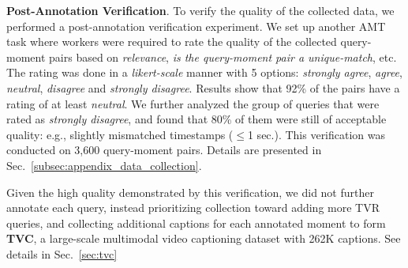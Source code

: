 \documentclass[runningheads]{llncs}
\begin{document}
\noindent\textbf{Post-Annotation Verification}. 
To verify the quality of the collected data, we performed a post-annotation verification experiment. 
We set up another AMT task where workers were required to rate the quality of the collected query-moment pairs based on \textit{relevance}, \textit{is the query-moment pair a unique-match}, etc. 
The rating was done in a \textit{likert-scale} manner with 5 options: \textit{strongly agree}, \textit{agree}, \textit{neutral}, \textit{disagree} and \textit{strongly disagree}. 
Results show that 92\% of the pairs have a rating of at least \textit{neutral}.
We further analyzed the group of queries that were rated as \textit{strongly disagree}, and found that 80\% of them were still of acceptable quality: e.g., slightly mismatched timestamps ($\leq$1 sec.). 
This verification was conducted on 3,600 query-moment pairs. 
Details are presented in Sec.~\ref{subsec:appendix_data_collection}. 

Given the high quality demonstrated by this verification, we did not further annotate each query, instead prioritizing collection toward  adding more TVR queries, and collecting additional captions for each annotated moment to form \textbf{TVC}, a large-scale multimodal video captioning dataset with 262K captions. See details in Sec.~\ref{sec:tvc}
\end{document}
